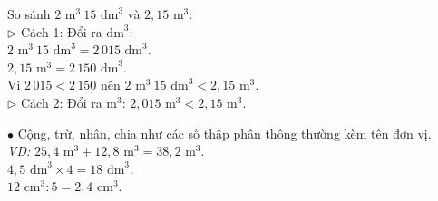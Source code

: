 \documentclass[14pt,a4paper,oneside]{extbook}
\begin{document}
\noindent
\begin{minipage}[t]{0.52\textwidth}
  \begin{tcolorbox}[
    enhanced,
    title={\footnotesize\bfseries\color{white}\faBalanceScale\ 2. So sánh các số đo thể tích},
    colback=teal!2!white,
    colframe=teal!75!black,
    arc=2.5mm, boxrule=0.8pt, top=1.8mm, bottom=1.8mm, left=2.2mm, right=2.2mm
  ]
    \footnotesize
    So sánh $2\text{ m}^3\ 15\text{ dm}^3$ và $2,15\text{ m}^3$:\\
    $\triangleright$ Cách 1: Đổi ra $\text{dm}^3$:\\
    \quad $2\text{ m}^3\ 15\text{ dm}^3 = 2\,015\text{ dm}^3$.\\
    \quad $2,15\text{ m}^3 = 2\,150\text{ dm}^3$.\\
    Vì $2\,015 < 2\,150$ nên $2\text{ m}^3\ 15\text{ dm}^3 < 2,15\text{ m}^3$.\\
    $\triangleright$ Cách 2: Đổi ra $\text{m}^3$: $2,015\text{ m}^3 < 2,15\text{ m}^3$.
  \end{tcolorbox}
\end{minipage}%
\hfill
\begin{minipage}[t]{0.46\textwidth}
  \begin{tcolorbox}[
    enhanced,
    title={\footnotesize\bfseries\color{white}\faCalculator\ 3. Phép tính với số đo thể tích},
    colback=purple!2!white,
    colframe=purple!70!black,
    arc=2.5mm, boxrule=0.8pt, top=1.8mm, bottom=1.8mm, left=2mm, right=2mm
  ]
    \footnotesize
    $\bullet$ Cộng, trừ, nhân, chia như các số thập phân thông thường kèm tên đơn vị.\\
    \textit{VD:} $25,4\text{ m}^3 + 12,8\text{ m}^3 = 38,2\text{ m}^3$.\\
    $4,5\text{ dm}^3 \times 4 = 18\text{ dm}^3$.\\
    $12\text{ cm}^3 : 5 = 2,4\text{ cm}^3$.
  \end{tcolorbox}
\end{minipage}

\vspace{3mm}
\end{document}
